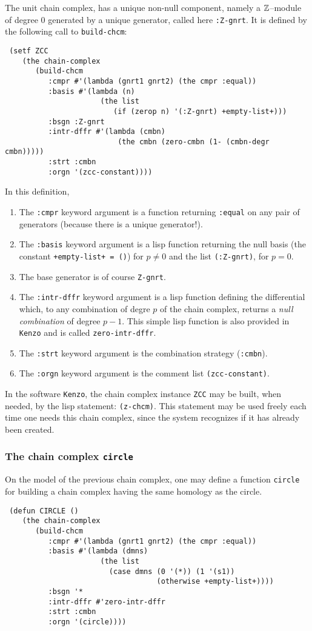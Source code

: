 The unit chain complex, has a unique non-null component,
namely a ${\mathbb{Z}}$--module of degree $0$ generated by a unique generator,
called here {\tt :Z-gnrt}. It is defined by the following call to {\tt build-chcm}:
{\footnotesize\begin{verbatim}
 (setf ZCC
    (the chain-complex
       (build-chcm
          :cmpr #'(lambda (gnrt1 gnrt2) (the cmpr :equal))
          :basis #'(lambda (n)
                      (the list
                         (if (zerop n) '(:Z-gnrt) +empty-list+)))
          :bsgn :Z-gnrt
          :intr-dffr #'(lambda (cmbn)
                          (the cmbn (zero-cmbn (1- (cmbn-degr cmbn)))))
          :strt :cmbn
          :orgn '(zcc-constant))))
\end{verbatim}
}
In this definition,
\begin{enumerate}
\item The {\tt :cmpr} keyword   argument is a function  returning {\tt :equal} on any pair
of generators (because there is a unique generator!).
\item The {\tt :basis} keyword argument is a lisp function returning the null basis
(the constant {\tt +empty-list+ = ()}) for $p \not= 0$ and
the list {\tt (:Z-gnrt)}, for $p=0$.
\item The base generator is of course {\tt Z-gnrt}.
\item The {\tt :intr-dffr} keyword argument is a lisp function defining the differential  which,
to any combination of degre $p$
of the chain complex, returns a {\em null combination} of degree $p-1$. This simple lisp function
is also provided in {\tt Kenzo} and is called {\tt zero-intr-dffr}.
\item The {\tt :strt} keyword argument is the combination strategy ({\tt :cmbn}).
\item The {\tt :orgn} keyword argument is the comment list {\tt (zcc-constant)}.
\end{enumerate}
In the software {\tt Kenzo}, the chain complex instance {\tt ZCC} may be built, when needed,
by the lisp statement: {\tt (z-chcm)}. This statement may be used freely each time
one needs this chain complex, since the system  recognizes if it has already been
created.

\subsubsection {The chain complex {\tt circle}}

On the model of the previous chain complex, one may define a function {\tt circle} for building a chain complex
having the same homology as the circle.
{\footnotesize\begin{verbatim}
 (defun CIRCLE ()
    (the chain-complex
       (build-chcm
          :cmpr #'(lambda (gnrt1 gnrt2) (the cmpr :equal))
          :basis #'(lambda (dmns)
                      (the list
                        (case dmns (0 '(*)) (1 '(s1))
                                   (otherwise +empty-list+))))
          :bsgn '*
          :intr-dffr #'zero-intr-dffr
          :strt :cmbn
          :orgn '(circle))))
\end{verbatim}
}


